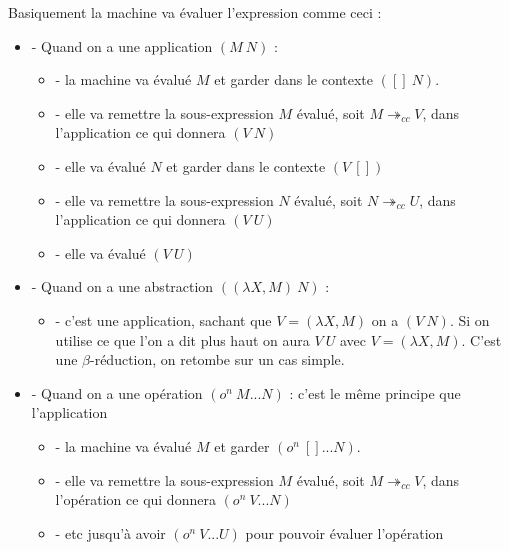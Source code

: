 \documentclass[10pt,a4paper]{report}
\begin{document}
Basiquement la machine va évaluer l'expression comme ceci :
\begin{itemize}
\item[] - Quand on a une application $(M~N)$ :
  \begin{itemize}
  \item[] - la machine va évalué $M$ et garder dans le contexte $([]~N)$.
  \item[] - elle va remettre la sous-expression $M$ évalué, soit $M \twoheadrightarrow_{cc} V$, dans l'application ce qui donnera $(V~N)$
  \item[] - elle va évalué $N$ et garder dans le contexte $(V~[])$ 
  \item[] - elle va remettre la sous-expression $N$ évalué, soit $N \twoheadrightarrow_{cc} U$, dans l'application ce qui donnera $(V~U)$
  \item[] - elle va évalué $(V~U)$ 
  \end{itemize}
\item[] - Quand on a une abstraction $((\lambda X,M)~N)$ : 
  \begin{itemize}
  \item[] - c'est une application, sachant que $V = (\lambda X,M)$ on a $(V~N)$. Si on utilise ce que l'on a dit plus haut on aura $V~U$ avec  $V = (\lambda X,M)$. C'est une $\beta$-réduction, on retombe sur un cas simple.
  \end{itemize}
\item[] - Quand on a une opération $(o^{n}~M...N)$ : c'est le même principe que l'application
  \begin{itemize}
  \item[] - la machine va évalué $M$ et garder $(o^{n}~[]...N)$.
  \item[] - elle va remettre la sous-expression $M$ évalué, soit $M \twoheadrightarrow_{cc} V$, dans l'opération ce qui donnera $(o^{n}~V...N)$
  \item[] - etc jusqu'à avoir $(o^{n}~V...U)$ pour pouvoir évaluer l'opération
  \end{itemize}
\end{itemize}
\bigbreak
\end{document}
